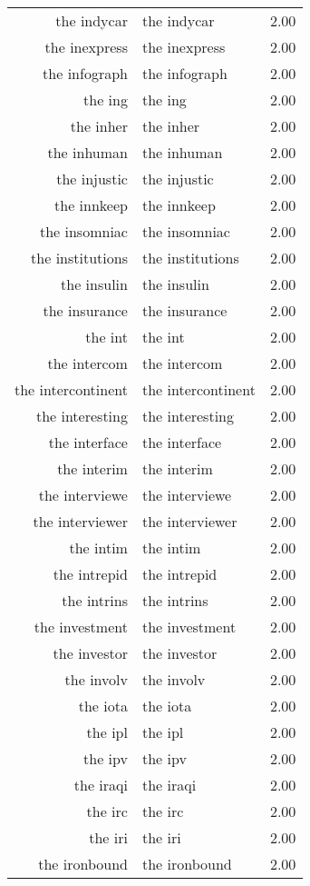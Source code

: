 \begin{table}[ht]
\begin{tabular}{rlr}
  the indycar & the indycar & 2.00 \\ 
  the inexpress & the inexpress & 2.00 \\ 
  the infograph & the infograph & 2.00 \\ 
  the ing & the ing & 2.00 \\ 
  the inher & the inher & 2.00 \\ 
  the inhuman & the inhuman & 2.00 \\ 
  the injustic & the injustic & 2.00 \\ 
  the innkeep & the innkeep & 2.00 \\ 
  the insomniac & the insomniac & 2.00 \\ 
  the institutions & the institutions & 2.00 \\ 
  the insulin & the insulin & 2.00 \\ 
  the insurance & the insurance & 2.00 \\ 
  the int & the int & 2.00 \\ 
  the intercom & the intercom & 2.00 \\ 
  the intercontinent & the intercontinent & 2.00 \\ 
  the interesting & the interesting & 2.00 \\ 
  the interface & the interface & 2.00 \\ 
  the interim & the interim & 2.00 \\ 
  the interviewe & the interviewe & 2.00 \\ 
  the interviewer & the interviewer & 2.00 \\ 
  the intim & the intim & 2.00 \\ 
  the intrepid & the intrepid & 2.00 \\ 
  the intrins & the intrins & 2.00 \\ 
  the investment & the investment & 2.00 \\ 
  the investor & the investor & 2.00 \\ 
  the involv & the involv & 2.00 \\ 
  the iota & the iota & 2.00 \\ 
  the ipl & the ipl & 2.00 \\ 
  the ipv & the ipv & 2.00 \\ 
  the iraqi & the iraqi & 2.00 \\ 
  the irc & the irc & 2.00 \\ 
  the iri & the iri & 2.00 \\ 
  the ironbound & the ironbound & 2.00 \\ 

\end{tabular}
\end{table}
